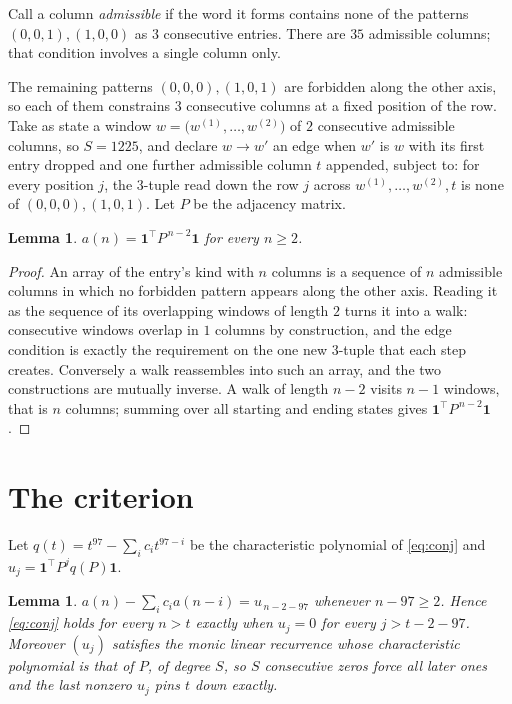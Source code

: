 \documentclass[11pt,a4paper]{article}
\theoremstyle{plain}
\newtheorem{lemma}[theorem]{Lemma}
\theoremstyle{definition}
\begin{document}
Call a column \emph{admissible} if the word it forms contains none of the patterns
$(0,0,1), (1,0,0)$ as $3$ consecutive entries. There are $35$ admissible columns; that condition
involves a single column only.

The remaining patterns $(0,0,0), (1,0,1)$ are forbidden along the other axis, so each of them
constrains $3$ consecutive columns at a fixed position of the row. Take as state a
window $w=\bigl(w^{(1)},\dots,w^{(2)}\bigr)$ of $2$ consecutive admissible
columns, so $S=1225$, and declare $w\to w'$ an edge when $w'$ is $w$ with its first entry
dropped and one further admissible column $t$ appended, subject to: for every position
$j$, the $3$-tuple read down the row $j$ across $w^{(1)},\dots,w^{(2)},t$
is none of $(0,0,0), (1,0,1)$. Let $P$ be the adjacency matrix.

\begin{lemma}\label{lem:walk}
$a(n)=\mathbf{1}^{\!\top}P^{\,n-2}\mathbf{1}$ for every $n\ge2$.
\end{lemma}

\begin{proof}
An array of the entry's kind with $n$ columns is a sequence of $n$ admissible columns in
which no forbidden pattern appears along the other axis. Reading it as the sequence of its
overlapping windows of length $2$ turns it into a walk: consecutive windows overlap in
$1$ columns by construction, and the edge condition is exactly the requirement on the one
new $3$-tuple that each step creates. Conversely a walk reassembles into such an array,
and the two constructions are mutually inverse. A walk of length $n-2$ visits $n-1$
windows, that is $n$ columns; summing over all starting and ending states gives
$\mathbf{1}^{\!\top}P^{\,n-2}\mathbf{1}$.
\end{proof}

\section{The criterion}

Let $q(t)=t^{97}-\sum_i c_i t^{97-i}$ be the characteristic polynomial of
\eqref{eq:conj} and $u_j=\mathbf{1}^{\!\top}P^{j}q(P)\mathbf{1}$.

\begin{lemma}\label{lem:crit}
$a(n)-\sum_i c_i a(n-i)=u_{\,n-2-97}$ whenever $n-97\ge2$. Hence
\eqref{eq:conj} holds for every $n>t$ exactly when $u_j=0$ for every
$j>t-2-97$. Moreover $(u_j)$ satisfies the monic linear recurrence whose
characteristic polynomial is that of $P$, of degree $S$, so $S$ consecutive zeros force all
later ones and the last nonzero $u_j$ pins $t$ down exactly.
\end{lemma}
\end{document}
